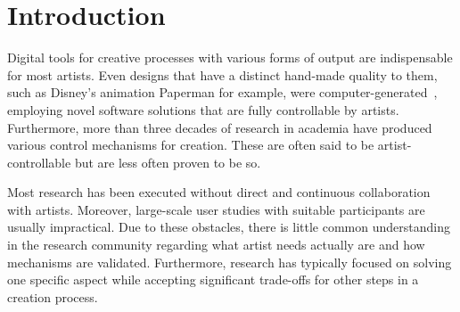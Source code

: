 


\section{Introduction}



Digital tools for creative processes with various forms of output are indispensable for most artists. Even designs that have a distinct hand-made quality to them, such as Disney's animation Paperman for example, were computer-generated~\cite{disney_2012_ppm}, employing novel software solutions that are fully controllable by artists. Furthermore, more than three decades of research in academia have produced various control mechanisms for creation. These are often said to be artist-controllable but are less often proven to be so.

Most research has been executed without direct and continuous collaboration with artists. Moreover, large-scale user studies with suitable participants are usually impractical. Due to these obstacles, there is little common understanding in the research community regarding what artist needs actually are and how mechanisms are validated. Furthermore, research has typically focused on solving one specific aspect while accepting significant trade-offs for other steps in a creation process.

